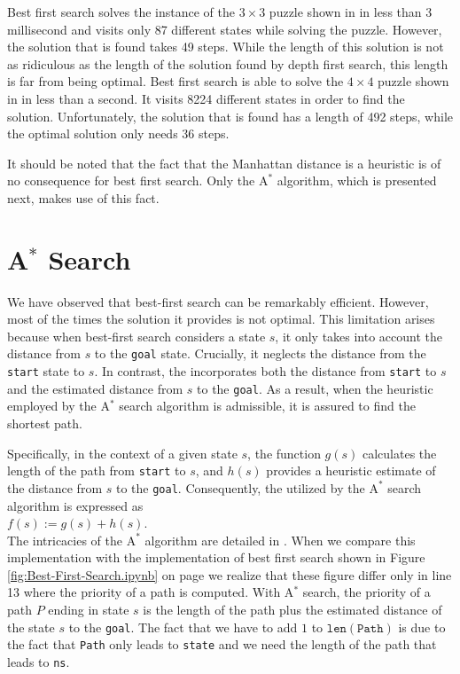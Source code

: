 Best first search solves the instance of the $3 \times 3$ puzzle shown in  in less than 3
millisecond and visits only 87 different states while solving the puzzle.  However, the solution that is found
takes 49 steps.  While the length of this solution is not as ridiculous as the length of the solution found by
depth first search,  this length is far from being optimal.  Best first search is able to solve the
$4 \times 4$ puzzle shown in  in less than a second.  It visits 8224 different states in
order to find the solution.  Unfortunately, the solution that is found has a length of 492 steps, while the
optimal solution only needs 36 steps.

It should be noted that the fact that the Manhattan distance is a  heuristic is of
no consequence for best first search.  Only the $\mathrm{A}^*$ algorithm, which is presented next, makes use of
this fact.

\section{A$^*$ Search \label{sec:a-star-search}}
We have observed that best-first search can be remarkably efficient. However, most of the times the solution it
provides is not optimal. This limitation arises because when best-first search considers a state \( s \), it
only takes into account the distance from \( s \) to the
\texttt{goal} state. Crucially, it neglects the distance from the \texttt{start} state to \( s \). In
contrast, the  incorporates both the distance from \texttt{start} to
\(s \) and the estimated distance from \( s \) to the \texttt{goal}. As a result, when the heuristic employed
by the A\(^*\) search algorithm is admissible, it is assured to find the shortest path. 

Specifically, in the context of a given state \( s \), the function \( g(s) \) calculates the length of the
path from \texttt{start} to \( s \), and \( h(s) \) provides a heuristic estimate of the distance from \( s \)
to the \texttt{goal}. Consequently, the  utilized by the \(\mathrm{A}^*\) search algorithm is
expressed as 
\\[0.2cm]
\hspace*{1.3cm}
\( f(s) := g(s) + h(s) \).
\\[0.2cm]
The intricacies of the \(\mathrm{A}^*\) algorithm are detailed in .  When we compare
this implementation with the implementation of best first search shown in Figure
\ref{fig:Best-First-Search.ipynb} on page \pageref{fig:Best-First-Search.ipynb} we realize that these figure
differ only in line 13 where the priority of a path is computed.  With A$^*$ search, the priority of a path $P$
ending in state $s$ is the length of the path plus the estimated distance of the state $s$ to the
\texttt{goal}.  The fact that we have to add $1$ to $\mathtt{len}(\mathtt{Path})$ is due to the fact that
\texttt{Path} only leads to \texttt{state} and we need the length of the path that leads to \texttt{ns}.


